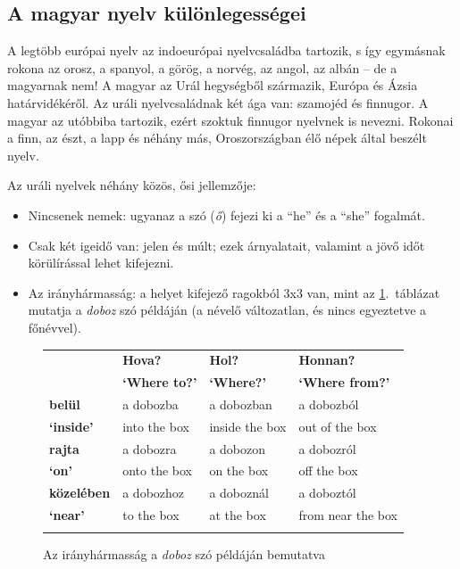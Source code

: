 \begin{multicols}{2}
  \subsection{A magyar nyelv különlegességei}

  A legtöbb európai nyelv az indoeurópai nyelvcsaládba tartozik, s így egymásnak rokona az orosz, a spanyol, a görög, a norvég, az angol, az albán -- de a magyarnak nem! A magyar az Urál hegységből származik, Európa és Ázsia határvidékéről. Az uráli nyelvcsaládnak két ága van: szamojéd és finnugor. A magyar az utóbbiba tartozik, ezért szoktuk finnugor nyelvnek is nevezni. Rokonai a finn, az észt, a lapp és néhány más, Oroszországban élő népek által beszélt nyelv.


  Az uráli nyelvek néhány közös, ősi jel\-lem\-ző\-je:

  \begin{itemize}
  \item Nincsenek nemek: ugyanaz a szó (\textit{ő}) fejezi ki a "`he"' és a "`she"' fogalmát.
  \item Csak két igeidő van: jelen és múlt; ezek árnyalatait, valamint a jövő időt körülírással lehet kifejezni.
  \item Az irányhármasság: a helyet kifejező ragokból 3x3 van, mint az \ref{doboz}.~táblázat mutatja a \textit{doboz} szó példáján (a névelő változatlan, és nincs egyeztetve a főnévvel).
  \end{itemize}

  \begin{figure}[htb]
    \setlength{\tabcolsep}{2em}
    \begin{tabularx}{\textwidth}{llll} \toprule\addlinespace
      \textbf{} & \textbf{Hova?} & \textbf{Hol?} & \textbf{Honnan?}\\
      \textbf{} & \textbf{`Where to?'} & \textbf{`Where?'} & \textbf{`Where from?'}\\
       \addlinespace\midrule\addlinespace
      \textbf{belül} & a dobozba & a dobozban & a dobozból\\
      \textbf{`inside'} & into the box & inside the box & out of the box\\
      \addlinespace\midrule\addlinespace
      \textbf{rajta} & a dobozra & a dobozon & a dobozról\\
      \textbf{`on'} & onto the box & on the box & off the box\\ 
      \addlinespace\midrule\addlinespace
      \textbf{közelében} & a dobozhoz & a doboznál & a doboztól\\
      \textbf{`near'} & to the box & at the box & from near the box\\ \addlinespace\bottomrule
    \end{tabularx}
    \caption{Az irányhármasság a \textit{doboz} szó példáján bemutatva}
    \label{doboz}
  \end{figure}


\end{multicols}
